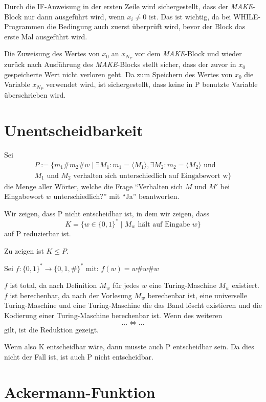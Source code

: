 \documentclass[10pt,leqno ]{article}
\begin{document}
Durch die IF-Anweisung in der ersten Zeile wird sichergestellt, dass der \textit{MAKE}-Block nur dann ausgeführt wird, wenn $x_i \neq 0$ ist. Das ist wichtig, da bei WHILE-Programmen die Bedingung auch zuerst überprüft wird, bevor der Block das erste Mal ausgeführt wird.

Die Zuweisung des Wertes von $x_0$ an $x_{N_P}$ vor dem \textit{MAKE}-Block und wieder zurück nach Ausführung des \textit{MAKE}-Blocks stellt sicher, dass der zuvor in $x_0$ gespeicherte Wert nicht verloren geht. Da zum Speichern des Wertes von $x_0$ die Variable $x_{N_P}$ verwendet wird, ist sichergestellt, dass keine in P benutzte Variable überschrieben wird.

\pagebreak

\section{Unentscheidbarkeit}

Sei 
\begin{align*}
    P := \{ m_1 \# m_2 \# w \mid \exists M_1 : m_1 = \langle M_1 \rangle , \exists M_2 : m_2 = \langle M_2 \rangle \text{ und } \\ M_1 \text{ und } M_2 \text{ verhalten sich unterschiedlich auf Eingabewort w} \}
\end{align*}
die Menge aller Wörter, welche die Frage \enquote{Verhalten sich $M$ und $M'$ bei Eingabewort $w$ unterschiedlich?} mit \enquote{Ja} beantworten.

\begin{flushleft}
    Wir zeigen, dass P nicht entscheidbar ist, in dem wir zeigen, dass 
    \[ K = \{ w \in \{0,1 \}^* \mid M_w \text{ hält auf Eingabe } w \} \]
    auf P reduzierbar ist.
\end{flushleft}

\begin{flushleft}
    Zu zeigen ist $K \leq P$.
\end{flushleft}

\begin{flushleft}
    Sei $f: \{ 0, 1 \}^* \rightarrow \{ 0,1,\# \}^*$ mit: \( f(w) = w\#w\#w \)
\end{flushleft}

\begin{flushleft}
    $f$ ist total, da nach Definition $M_w$ für jedes $w$ eine Turing-Maschine $M_w$ existiert. $f$ ist berechenbar, da nach der Vorlesung $M_w$ berechenbar ist, eine universelle Turing-Maschine und eine Turing-Maschine die das Band löscht existieren und die Kodierung einer Turing-Maschine berechenbar ist.
    Wenn des weiteren
    \[... \Leftrightarrow ... \]
    gilt, ist die Reduktion gezeigt.
\end{flushleft}


\begin{flushleft}
    Wenn also K entscheidbar wäre, dann musste auch P entscheidbar sein. Da dies nicht der Fall ist, ist auch P nicht entscheidbar. 
\end{flushleft}

\pagebreak

\section{Ackermann-Funktion}
\end{document}
